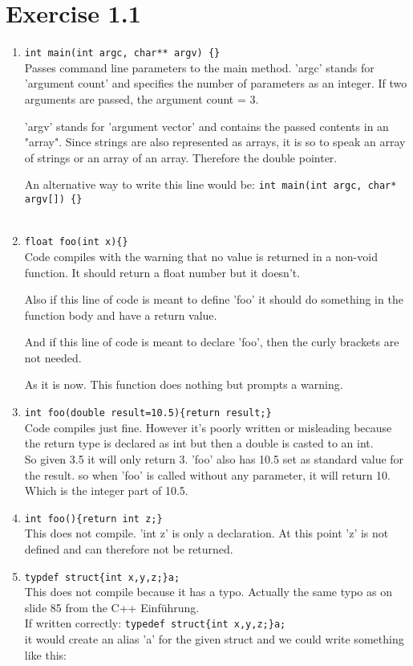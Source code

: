 \documentclass{article} %
\newcommand{\homeworkNumber}{1} %
\begin{document}
\section*{Exercise \homeworkNumber.1}
\begin{enumerate}[1.]
\item \verb|int main(int argc, char** argv) {}|\\
Passes command line parameters to the main method. 'argc' stands for 'argument count' and specifies the number of parameters as an integer. If two arguments are passed, the argument count = 3.

'argv' stands for 'argument vector' and contains the passed contents in an "array". Since strings are also represented as arrays, it is so to speak an array of strings or an array of an array. Therefore the double pointer.

An alternative way to write this line would be: \verb|int main(int argc, char* argv[]) {}|\\\\


\item \verb|float foo(int x){}|\\
Code compiles with the warning that no value is returned in a non-void function. It should return a float number but it doesn't.

Also if this line of code is meant to define 'foo' it should do something in the function body and have a return value.

And if this line of code is meant to declare 'foo', then the curly brackets are not needed.

As it is now. This function does nothing but prompts a warning.


\item \verb|int foo(double result=10.5){return result;}|\\
Code compiles just fine. However it's poorly written or misleading because the return type is declared as int but then a double is casted to an int. \\
So given 3.5 it will only return 3. 'foo' also has 10.5 set as standard value for the result. so when 'foo' is called without any parameter, it will return 10. Which is the integer part of 10.5.


\item \verb|int foo(){return int z;}|\\
This does not compile. 'int z' is only a declaration. At this point 'z' is not defined and can therefore not be returned.


\item \verb|typdef struct{int x,y,z;}a;|\\
This does not compile because it has a typo. Actually the same typo as on slide 85 from the C++ Einführung.\\
If written correctly: \verb|typedef struct{int x,y,z;}a;|\\ it would create an alias 'a' for the given struct and we could write something like this:


\end{enumerate}
\end{document}

